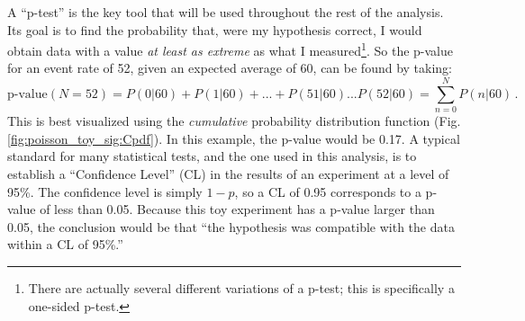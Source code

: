     \FloatBarrier
    A ``p-test'' is the key tool that will be used throughout the rest of the analysis.
    Its goal is to find the probability that, were my hypothesis correct,
        I would obtain data with a value \textit{at least as extreme} as what I measured\footnote{
            There are actually several different variations of a p-test;
            this is specifically a one-sided p-test.
        }.
    So the p-value for an event rate of 52, given an expected average of 60, can be found by taking:
    \begin{equation}
        \textrm{p-value}(N=52) = P(0|60) + P(1|60) + ... + P(51|60) ... P(52|60) = \sum\limits_{n=0}^N P(n|60)
        \,.
    \end{equation}
    This is best visualized using the \textit{cumulative} probability distribution function (Fig. \ref{fig:poisson_toy_sig:Cpdf}).
    In this example, the p-value would be 0.17.
    A typical standard for many statistical tests, and the one used in this analysis,
        is to establish a ``Confidence Level'' (CL) in the results of an experiment at a level of 95\%. 
    The confidence level is simply $1-p$, so a CL of 0.95 corresponds to a p-value of less than 0.05.
    Because this toy experiment has a p-value larger than 0.05,
        the conclusion would be that ``the hypothesis was compatible with the data within a CL of 95\%.''


